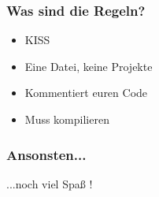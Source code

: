 \documentclass[accentcolor=tud3c,colorbacktitle,inverttitle,landscape,german,presentation,t]{tudbeamer}
\begin{document}
\begin{frame}
	\frametitle{Was sind die Regeln?}
	\begin{itemize}
		\item KISS
		\item Eine Datei, keine Projekte
		\item Kommentiert euren Code 
		\item Muss kompilieren
	\end{itemize}
\end{frame}

\begin{frame}
	\frametitle{Ansonsten...}
	\vspace{15mm}
	\begin{center}
		\huge ...noch viel Spaß !
	\end{center}
\end{frame}
\end{document}
